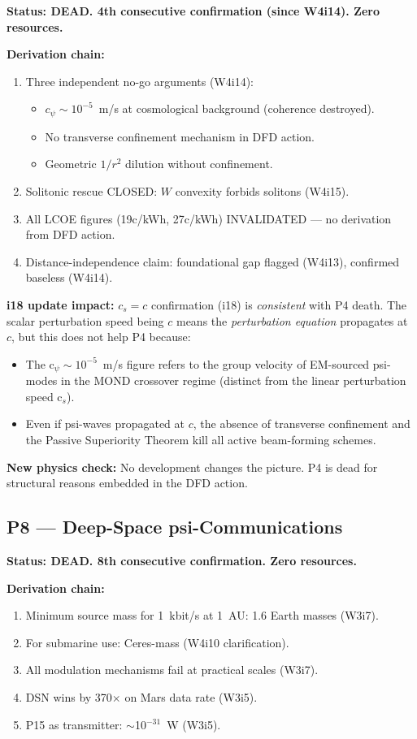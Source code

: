\documentclass[11pt]{article}
\begin{document}
\textbf{Status: DEAD. 4th consecutive confirmation (since W4i14). Zero resources.}

\textbf{Derivation chain:}
\begin{enumerate}
\item Three independent no-go arguments (W4i14):
  \begin{itemize}
  \item $c_\psi \sim 10^{-5}$~m/s at cosmological background (coherence destroyed).
  \item No transverse confinement mechanism in DFD action.
  \item Geometric $1/r^2$ dilution without confinement.
  \end{itemize}
\item Solitonic rescue CLOSED: $W$ convexity forbids solitons (W4i15).
\item All LCOE figures (19c/kWh, 27c/kWh) INVALIDATED --- no derivation from DFD action.
\item Distance-independence claim: foundational gap flagged (W4i13), confirmed baseless (W4i14).
\end{enumerate}

\textbf{i18 update impact:} $c_s = c$ confirmation (i18) is \emph{consistent} with P4 death. The scalar perturbation speed being $c$ means the \emph{perturbation equation} propagates at $c$, but this does not help P4 because:
\begin{itemize}
\item The c$_\psi \sim 10^{-5}$~m/s figure refers to the group velocity of EM-sourced psi-modes in the MOND crossover regime (distinct from the linear perturbation speed c$_s$).
\item Even if psi-waves propagated at $c$, the absence of transverse confinement and the Passive Superiority Theorem kill all active beam-forming schemes.
\end{itemize}

\textbf{New physics check:} No development changes the picture. P4 is dead for structural reasons embedded in the DFD action.

\subsection{P8 --- Deep-Space psi-Communications}

\textbf{Status: DEAD. 8th consecutive confirmation. Zero resources.}

\textbf{Derivation chain:}
\begin{enumerate}
\item Minimum source mass for 1~kbit/s at 1~AU: 1.6 Earth masses (W3i7).
\item For submarine use: Ceres-mass (W4i10 clarification).
\item All modulation mechanisms fail at practical scales (W3i7).
\item DSN wins by 370$\times$ on Mars data rate (W3i5).
\item P15 as transmitter: $\sim$10$^{-31}$~W (W3i5).
\end{enumerate}
\end{document}
